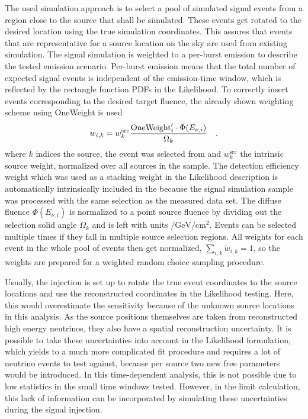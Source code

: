 The used simulation approach is to select a pool of simulated signal events from a region close to the source that shall be simulated.
These events get rotated to the desired location using the true simulation coordinates.
This assures that events that are representative for a source location on the sky are used from existing simulation.
The signal simulation is weighted to a per-burst emission to describe the tested emission scenario.
Per-burst emission means that the total number of expected signal events is independent of the emission-time window, which is reflected by the rectangle function PDFs in the Likelihood.
To correctly insert events corresponding to the desired target fluence, the already shown weighting scheme using OneWeight is used
\begin{equation}
  \label{equ:sig_inj_weights}
  w_{i,k} = w_k^\text{src} \frac{\text{OneWeight}'_i \cdot \Phi(E_{\nu,i})}{\Omega_k}
  \quad\text{.}
\end{equation}
where $k$ indices the source, the event was selected from and $w_k^\text{src}$ the intrinsic source weight, normalized over all sources in the sample.
The detection efficiency weight which was used as a stacking weight in the Likelihood description is automatically intrinsically included in the because the signal simulation sample was processed with the same selection as the measured data set.
The diffuse fluence $\Phi(E_{\nu,i})$ is normalized to a point source fluence by dividing out the selection solid angle $\Omega_k$ and is left with units $\si{\per\GeV\per\cm\squared}$.
Events can be selected multiple times if they fall in multiple source selection regions.
All weights for each event in the whole pool of events then get normalized, $\sum_{i,k}\tilde{w}_{i,k} = 1$, so the weights are prepared for a weighted random choice sampling procedure.

Usually, the injection is set up to rotate the true event coordinates to the source locations and use the reconstructed coordinates in the Likelihood testing.
Here, this would overestimate the sensitivity because of the unknown source locations in this analysis.
As the source positions themselves are taken from reconstructed high energy neutrinos, they also have a spatial reconstruction uncertainty.
It is possible to take these uncertainties into account in the Likelihood formulation, which yields to a much more complicated fit procedure and requires a lot of neutrino events to test against, because per source two new free parameters would be introduced.
In this time-dependent analysis, this is not possible due to low statistics in the small time windows tested.
However, in the limit calculation, this lack of information can be incorporated by simulating these uncertainties during the signal injection.

